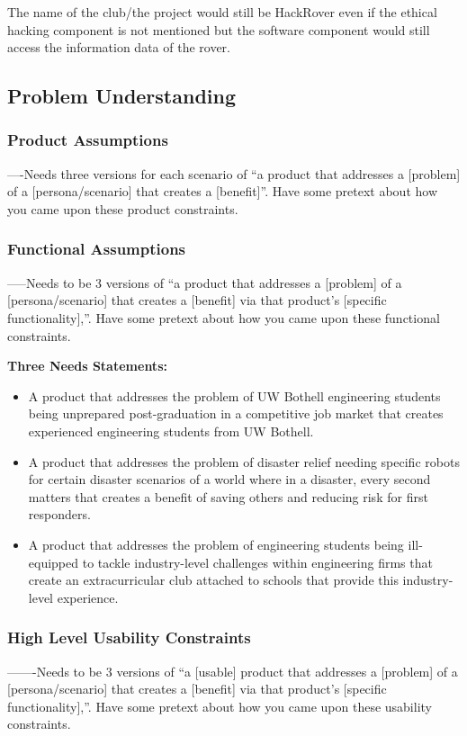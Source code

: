 \documentclass[a4paper, 10pt]{article}
\begin{document}
The name of the club/the project would still be HackRover even if the ethical hacking component is not mentioned but the software component would still access the information data of the rover.

	\subsection{Problem Understanding}
		\subsubsection{Product Assumptions}
		----Needs three versions for each scenario of “a product that addresses a [problem] of a [persona/scenario] that creates a [benefit]”. Have some pretext about how you came upon these product constraints.
		
		\subsubsection{Functional Assumptions}
		-----Needs to be 3 versions of “a product that addresses a [problem] of a [persona/scenario] that creates a [benefit] via that product’s [specific functionality],”. Have some pretext about how you came upon these functional constraints.	
		
		\textbf{Three Needs Statements:}
		\begin{itemize}
			\item		
			A product that addresses the problem of UW Bothell engineering students being unprepared post-graduation in a competitive job market that creates experienced engineering students from UW Bothell.

			\item
			A product that addresses the problem of disaster relief needing specific robots for certain disaster scenarios of a world where in a disaster, every second matters that creates a benefit of saving others and reducing risk for first responders.

			\item
			A product that addresses the problem of engineering students being ill-equipped to tackle industry-level challenges within engineering firms that create an extracurricular club attached to schools that provide this industry-level experience. 
\end{itemize}

		\subsubsection{High Level Usability Constraints}
		-------Needs to be 3 versions of “a [usable] product that addresses a [problem] of a [persona/scenario] that creates a [benefit] via that product’s [specific functionality],”. Have some pretext about how you came upon these usability constraints.
					
\end{document}
